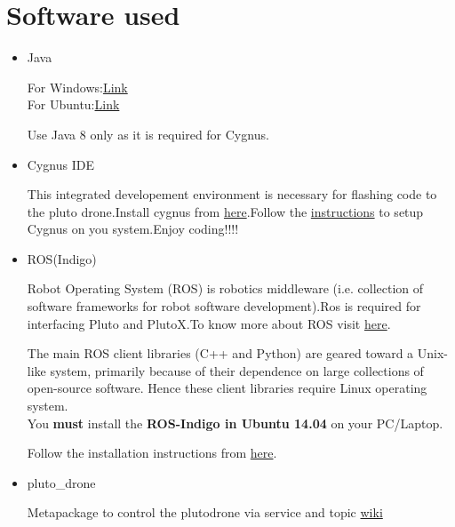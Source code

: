 \documentclass[a4paper,12pt,oneside]{book}
\begin{document}
\section{Software used}
\begin{itemize}
 \subsection{Indoor}
  \item Java
  
  For Windows:\href{http://www.oracle.com/technetwork/java/javase/downloads/jdk8-downloads-2133151.html}{Link}\\
  For Ubuntu:\href{http://tipsonubuntu.com/2016/07/31/install-oracle-java-8-9-ubuntu-16-04-linux-mint-18/}{Link}
  
  Use Java 8 only as it is required for Cygnus.

  \item Cygnus IDE
  
  This integrated developement environment is necessary for flashing code to the pluto drone.Install cygnus from \href{https://drive.google.com/drive/folders/12yho1OL4OuOJdStSYlG2r4aEH-reXx16}{here}.Follow the \href{https://github.com/eYSIP-2018/Flying-Sensor-Node/wiki/Setting-Up-Cygnus}{instructions} to setup Cygnus on you system.Enjoy coding!!!!
  
  \item ROS(Indigo)
  
  Robot Operating System (ROS) is robotics middleware (i.e. collection of software frameworks for robot software development).Ros is required for interfacing Pluto and PlutoX.To know more about ROS visit \href{https://en.wikipedia.org/wiki/Robot_Operating_System}{here}.
  
  The main ROS client libraries (C++ and Python) are geared toward a Unix-like system, primarily
because of their dependence on large collections of open-source software. Hence these client libraries
require Linux operating system.\\
You \textbf{must} install the \textbf{ROS-Indigo in Ubuntu 14.04} on your PC/Laptop.

	Follow the installation instructions from \href{http://wiki.ros.org/indigo/Installation/Ubuntu}{here}.
   
   \item pluto\_drone
   
   Metapackage to control the plutodrone via service and topic \href{http://wiki.ros.org/pluto_drone}{wiki} 
   

\end{itemize}
\end{document}
